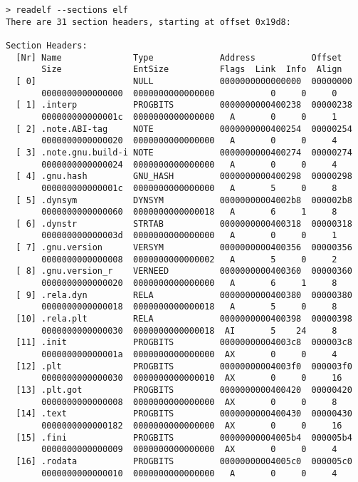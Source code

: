 \begin{lstlisting}
> readelf --sections elf
There are 31 section headers, starting at offset 0x19d8:

Section Headers:
  [Nr] Name              Type             Address           Offset
       Size              EntSize          Flags  Link  Info  Align
  [ 0]                   NULL             0000000000000000  00000000
       0000000000000000  0000000000000000           0     0     0
  [ 1] .interp           PROGBITS         0000000000400238  00000238
       000000000000001c  0000000000000000   A       0     0     1
  [ 2] .note.ABI-tag     NOTE             0000000000400254  00000254
       0000000000000020  0000000000000000   A       0     0     4
  [ 3] .note.gnu.build-i NOTE             0000000000400274  00000274
       0000000000000024  0000000000000000   A       0     0     4
  [ 4] .gnu.hash         GNU_HASH         0000000000400298  00000298
       000000000000001c  0000000000000000   A       5     0     8
  [ 5] .dynsym           DYNSYM           00000000004002b8  000002b8
       0000000000000060  0000000000000018   A       6     1     8
  [ 6] .dynstr           STRTAB           0000000000400318  00000318
       000000000000003d  0000000000000000   A       0     0     1
  [ 7] .gnu.version      VERSYM           0000000000400356  00000356
       0000000000000008  0000000000000002   A       5     0     2
  [ 8] .gnu.version_r    VERNEED          0000000000400360  00000360
       0000000000000020  0000000000000000   A       6     1     8
  [ 9] .rela.dyn         RELA             0000000000400380  00000380
       0000000000000018  0000000000000018   A       5     0     8
  [10] .rela.plt         RELA             0000000000400398  00000398
       0000000000000030  0000000000000018  AI       5    24     8
  [11] .init             PROGBITS         00000000004003c8  000003c8
       000000000000001a  0000000000000000  AX       0     0     4
  [12] .plt              PROGBITS         00000000004003f0  000003f0
       0000000000000030  0000000000000010  AX       0     0     16
  [13] .plt.got          PROGBITS         0000000000400420  00000420
       0000000000000008  0000000000000000  AX       0     0     8
  [14] .text             PROGBITS         0000000000400430  00000430
       0000000000000182  0000000000000000  AX       0     0     16
  [15] .fini             PROGBITS         00000000004005b4  000005b4
       0000000000000009  0000000000000000  AX       0     0     4
  [16] .rodata           PROGBITS         00000000004005c0  000005c0
       0000000000000010  0000000000000000   A       0     0     4

\end{lstlisting}
